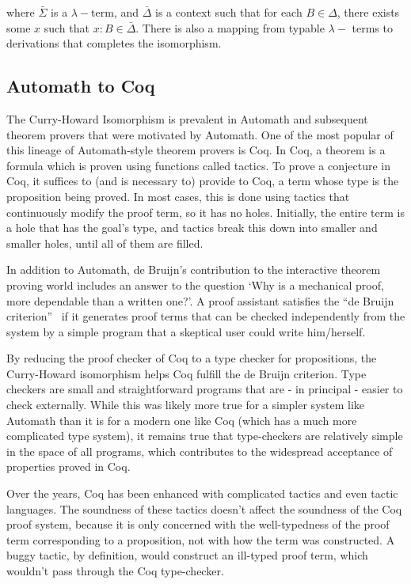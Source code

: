 \documentclass{article}
\begin{document}
	\noindent where $\bar{\Sigma}$ is a 
	$\lambda-$term,	and $\bar{\Delta}$ is a 
	context such that for each $B \in \Delta$, 
	there exists some $x$ such that 
	$x : B \in \bar{\Delta}$. There 
	is also a mapping from typable $\lambda-$ terms
	to derivations that completes the isomorphism.
	
	\subsection{Automath to Coq}
	\label{sec:coq}
	The Curry-Howard Isomorphism is prevalent in 
	Automath and subsequent theorem provers that 
	were motivated by Automath. One of the most 
	popular of this lineage of Automath-style 
	theorem provers is Coq. In Coq, a theorem is a 
	formula which is proven using functions 
	called tactics. To prove a conjecture in Coq, 
	it suffices to (and is necessary to) provide 
	to Coq, a term whose type is the proposition 
	being proved. In most cases, this is done 
	using tactics that continuously modify the 
	proof term, so it has no holes. Initially, 
	the entire term is a hole that has the goal's 
	type, and tactics break this down into smaller 
	and smaller holes, until all of them are 
	filled.
	
	In addition to Automath, de Bruijn's 
	contribution to the interactive theorem 
	proving world includes an answer to the 
	question `Why is a mechanical proof, 
	more dependable than a written one?'.
	A proof assistant satisfies the 
	``de Bruijn criterion''~\cite
	{10.5555/778522.778527} if it generates 
	proof terms that can be checked 
	independently from the system by a simple 
	program that a skeptical user could write 
	him/herself.
	
	By reducing the proof checker of Coq to 
	a type checker for propositions, the 
	Curry-Howard isomorphism helps Coq
	fulfill the de Bruijn criterion. Type 
	checkers are small and 
	straightforward programs that are - 
	in principal - easier to check 
	externally. 
	While this was likely 
	more true for a simpler system like 
	Automath than it is for a modern 
	one like Coq (which has a much 
	more complicated type system), it 
	remains true that type-checkers are 
	relatively simple in the space of 
	all programs, which contributes to 
	the widespread acceptance of 
	properties proved in Coq.
	
	Over the years, Coq has been enhanced 
	with complicated tactics and even 
	tactic languages. The soundness of 
	these tactics doesn't affect the 
	soundness of the Coq proof system, 
	because it is only concerned with 
	the well-typedness of the proof 
	term corresponding to a proposition,
	not with how the term was constructed. 
	A buggy tactic, by definition, would 
	construct an ill-typed proof term,
	which wouldn't pass through the 
	Coq type-checker.
	
\end{document}
